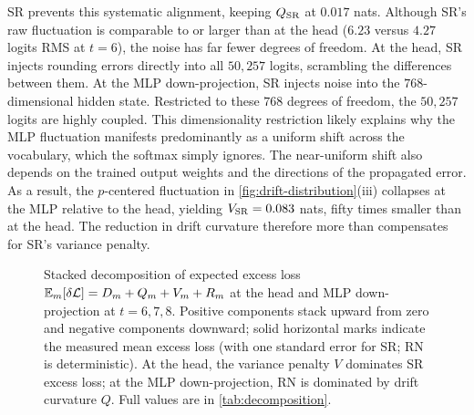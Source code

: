 SR prevents this systematic alignment, keeping $Q_{\mathrm{SR}}$ at $0.017$ nats.
Although SR's raw fluctuation is comparable to or larger than at the head
($6.23$ versus $4.27$ logits RMS at $t=6$), the noise has far fewer degrees of
freedom. At the head, SR injects rounding errors directly into all $50{,}257$
logits, scrambling the differences between them. At the MLP down-projection, SR
injects noise into the $768$-dimensional hidden state. Restricted to these $768$
degrees of freedom, the $50{,}257$ logits are highly coupled.  This
dimensionality restriction likely explains why the MLP fluctuation manifests
predominantly as a uniform shift across the vocabulary, which the softmax simply
ignores. The near-uniform shift also depends on the trained output weights and
the directions of the propagated error. As a result, the $p$-centered
fluctuation in \cref{fig:drift-distribution}(iii) collapses at the MLP relative
to the head, yielding $V_{\mathrm{SR}}=0.083$ nats, fifty times smaller than at the
head. The reduction in drift curvature therefore more than compensates for SR's
variance penalty.

\begin{figure}[!htb]
  \centering
  \caption{Stacked decomposition of expected excess loss
    $\mathbb{E}_m[\delta\mathcal L] = D_m + Q_m + V_m + R_m$ at the head and MLP
    down-projection at $t=6,7,8$. Positive components stack upward from zero
    and negative components downward; solid horizontal marks indicate the
    measured mean excess loss (with one standard error for SR; RN is
    deterministic). At the head, the variance penalty $V$
    dominates SR excess loss; at the MLP down-projection, RN is dominated by drift
    curvature $Q$. Full values are in \cref{tab:decomposition}.}
  \label{fig:head-decomposition-terms}
  \label{fig:mlp-decomposition-terms}
\end{figure}

